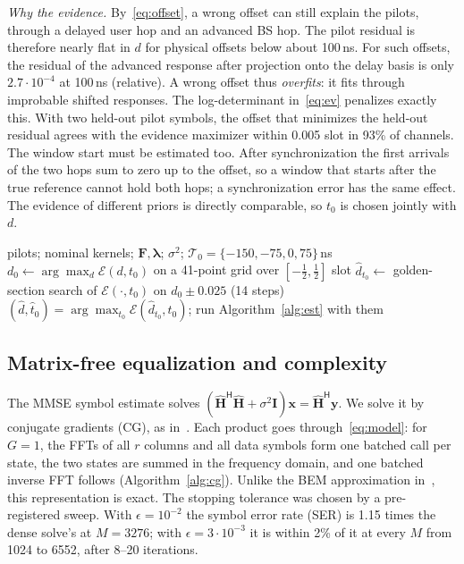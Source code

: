 \documentclass[conference,10pt]{IEEEtran}
\theoremstyle{remark}
\newcommand{\Hm}{\mathsf H}
\begin{document}
\emph{Why the evidence.} By~\eqref{eq:offset}, a wrong offset can still explain the pilots, through a delayed user hop
and an advanced BS hop. The pilot residual is therefore nearly flat in $d$ for physical offsets below about 100\,ns.
For such offsets, the residual of the advanced response after projection onto the delay basis is only $2.7\cdot10^{-4}$
at 100\,ns (relative). A wrong offset thus \emph{overfits}: it fits through improbable shifted responses. The log-determinant
in~\eqref{eq:ev} penalizes exactly this. With two held-out pilot symbols, the offset that minimizes the held-out
residual agrees with the evidence maximizer within 0.005 slot in 93\% of channels. The window start must be estimated
too. After synchronization the first arrivals of the two hops sum to zero up to the offset, so a window that starts after
the true reference cannot hold both hops; a synchronization error has the same effect. The evidence of different priors
is directly comparable, so $t_0$ is chosen jointly with $d$.

\begin{algorithm}[t]\caption{Offset and delay reference by evidence}\label{alg:offset}
\begin{algorithmic}[1]
\Require pilots; nominal kernels; $\bm F,\bm\lambda$; $\sigma^2$; $\mathcal T_0=\{-150,-75,0,75\}$\,ns
\State $d_0\gets\arg\max_d\mathcal E(d,t_0)$ on a 41-point grid over $[-\frac12,\frac12]$ slot
\State $\hat d_{t_0}\gets$ golden-section search of $\mathcal E(\cdot,t_0)$ on $d_0\pm0.025$ (14 steps)
\EndFor
\Ensure $(\hat d,\hat t_0)=\arg\max_{t_0}\mathcal E(\hat d_{t_0},t_0)$; run Algorithm~\ref{alg:est} with them
\end{algorithmic}
\end{algorithm}

\subsection{Matrix-free equalization and complexity}
The MMSE symbol estimate solves $(\hat{\bm H}^{\Hm}\hat{\bm H}+\sigma^2\bm I)\bm x=\hat{\bm H}^{\Hm}\bm y$. We solve it by
conjugate gradients (CG), as in~\cite{hrycak2010}. Each product goes through~\eqref{eq:model}: for $G=1$, the FFTs of all
$r$ columns and all data symbols form one batched call per state, the two states are summed in the frequency domain,
and one batched inverse FFT follows (Algorithm~\ref{alg:cg}). Unlike the BEM approximation in~\cite{hrycak2010}, this
representation is exact. The stopping tolerance was chosen by a pre-registered sweep. With $\epsilon=10^{-2}$ the
symbol error rate (SER) is 1.15 times the dense solve's at $M=3276$; with $\epsilon=3\cdot10^{-3}$ it is within 2\% of it at
every $M$ from 1024 to 6552, after 8--20 iterations.
\end{document}
